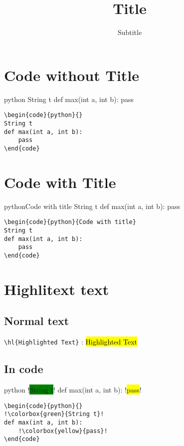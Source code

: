 \documentclass[
    fr,
    twoside]{customTemplate}
\title{Title}
\subtitle{Subtitle}
\begin{document}
\maketitlepage{}
\makerevisiontable{}
\cleardoublepage

%

\maketableofcontent{}
\cleardoublepage




\fullheader


\section{Code without Title}
\begin{code}{python}{}
String t
def max(int a, int b):
    pass
\end{code}
\begin{verbatim}
\begin{code}{python}{}
String t
def max(int a, int b):
    pass   
\end{code}
\end{verbatim}
\section{Code with Title}
\begin{code}{python}{Code with title}
String t
def max(int a, int b):
    pass
\end{code}
\begin{verbatim}
\begin{code}{python}{Code with title}
String t
def max(int a, int b):
    pass   
\end{code}
\end{verbatim}

\section{Highlitext text}
\subsection{Normal text}
\verb+\hl{Highlighted Text}+ : \hl{Highlighted Text}
\subsection{In code}
\begin{code}{python}{}
!\colorbox{green}{String t}!
def max(int a, int b):
    !\colorbox{yellow}{pass}!
\end{code}
\begin{verbatim}
\begin{code}{python}{}
!\colorbox{green}{String t}!
def max(int a, int b):
    !\colorbox{yellow}{pass}!
\end{code}    
\end{verbatim}
\end{document}
